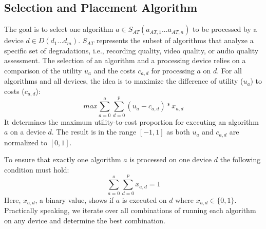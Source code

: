 \subsection{Selection and Placement Algorithm}
\label{sec:550_design_quality_selection}
The goal is to select one algorithm $a \in S_{AT}(a_{AT,1} ... a_{AT,n})$ to be processed by a device $d \in D(d_{1}...d_{m})$.
$S_{AT}$ represents the subset of algorithms that analyze a specific set of degradations, i.e., recording quality, video quality, or audio quality assessment.
The selection of an algorithm and a processing device relies on a comparison of the utility $u_{a}$ and the costs $c_{a,d}$ for processing $a$ on $d$.
For all algorithms and all devices, the idea is to maximize the difference of utility ($u_{a}$) to costs ($c_{a,d}$):
\begin{equation}
max \sum_{a=0}^{o} \sum_{d=0}^{p} (u_{a} - c_{a,d}) * x_{a,d}
\end{equation}
It determines the maximum utility-to-cost proportion for executing an algorithm $a$ on a device $d$.
The result is in the range $[-1,1]$ as both $u_{a}$ and $c_{a,d}$ are normalized to $[0, 1]$.

To ensure that exactly one algorithm $a$ is processed on one device $d$ the following condition must hold:
\begin{equation}
\sum_{a=0}^{o} \sum_{d=0}^{p} x_{a,d} = 1
\end{equation}
Here, $x_{a,d}$, a binary value, shows if $a$ is executed on $d$ where $x_{a,d} \in \{0,1\}$.
Practically speaking, we iterate over all combinations of running each algorithm on any device and determine the best combination.

